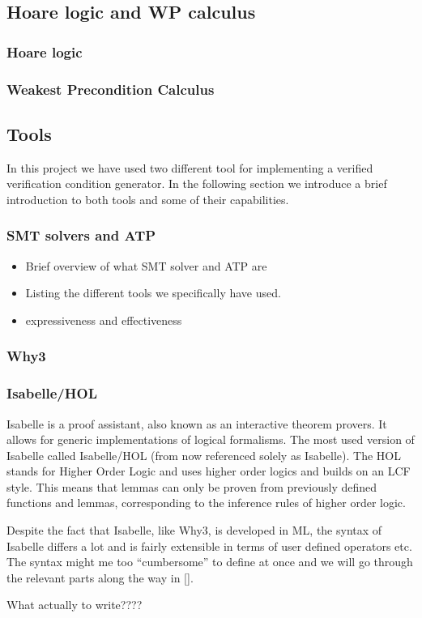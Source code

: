 \subsection{Hoare logic and WP calculus}\label{sec:hoarewp}

\subsubsection{Hoare logic}\label{sec:hoare}


\subsubsection{Weakest Precondition Calculus}\label{sec:wp}


\subsection{Tools}
In this project we have used two different tool for implementing a verified verification condition generator.
In the following section we introduce a brief introduction to both tools and some of their capabilities.

\subsubsection{SMT solvers and ATP}

\begin{itemize}
  \item Brief overview of what SMT solver and ATP are
  \item Listing the different tools we specifically have used.
  \item expressiveness and effectiveness
\end{itemize}

\subsubsection{Why3}\label{sec:why3}


\subsubsection{Isabelle/HOL}\label{sec:isabelle}
Isabelle is a proof assistant, also known as an interactive theorem provers.
It allows for generic implementations of logical formalisms.
The most used version of Isabelle called Isabelle/HOL (from now referenced solely as Isabelle).
The HOL stands for Higher Order Logic and uses higher order logics and builds on an LCF style.
This means that lemmas can only be proven from previously defined functions and lemmas, corresponding to the inference rules of higher order logic.

Despite the fact that Isabelle, like Why3, is developed in ML, the syntax of Isabelle differs a lot and is fairly extensible in terms of user defined operators etc.
The syntax might me too ``cumbersome'' to define at once and we will go through the relevant parts along the way in \autoref{}.

What actually to write????
